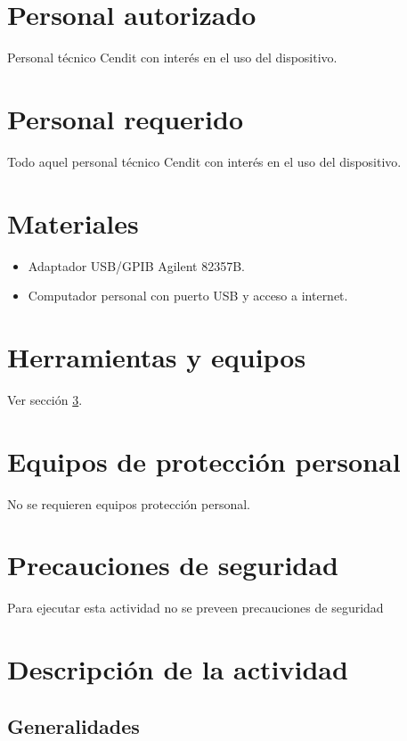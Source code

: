 \documentclass[paper=letter,oneside,fontsize=11pt, parskip=full]{scrartcl}
\begin{document}
	\section{Personal autorizado}
	
		Personal técnico Cendit con interés en el uso del dispositivo.
		
	\section{Personal requerido}
	
		Todo aquel personal técnico Cendit con interés en el uso del dispositivo.
		
	\section{Materiales}
		\label{Sec:SeccionMateriales}
		\begin{itemize}
			\item Adaptador USB/GPIB Agilent 82357B.
			\item Computador personal con puerto USB y acceso a internet.
		\end{itemize}	
			
	\section{Herramientas y equipos}
		
		Ver sección \ref{Sec:SeccionMateriales}.

	
	\section{Equipos de protección personal}
	
		No se requieren equipos protección personal.
		
	\section{Precauciones de seguridad}
	
		Para ejecutar esta actividad no se preveen precauciones de seguridad
		
	\section{Descripción de la actividad}
	
		\subsection{Generalidades}
	
\end{document}
